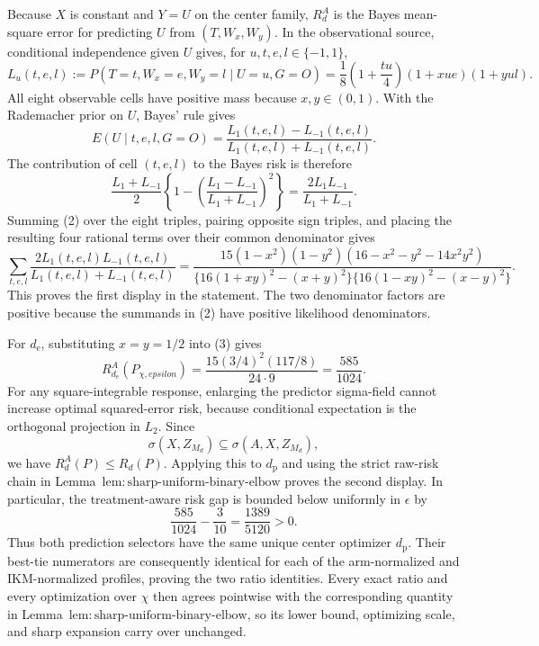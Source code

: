 Because \(X\) is constant and \(Y=U\) on the center family, \(R_d^A\) is the Bayes mean-square error for predicting \(U\) from \((T,W_x,W_y)\). In the observational source, conditional independence given \(U\) gives, for \(u,t,e,l\in\{-1,1\}\),
\[
 L_u(t,e,l):=P(T=t,W_x=e,W_y=l\mid U=u,G=O)
 =\frac18\left(1+\frac{tu}{4}\right)(1+xue)(1+yul). \tag{1}
\]
All eight observable cells have positive mass because \(x,y\in(0,1)\). With the Rademacher prior on \(U\), Bayes' rule gives
\[
 E(U\mid t,e,l,G=O)=\frac{L_1(t,e,l)-L_{-1}(t,e,l)}
 {L_1(t,e,l)+L_{-1}(t,e,l)}.
\]
The contribution of cell \((t,e,l)\) to the Bayes risk is therefore
\[
 \frac{L_1+L_{-1}}2
 \left\{1-\left(\frac{L_1-L_{-1}}{L_1+L_{-1}}\right)^2\right\}
 =\frac{2L_1L_{-1}}{L_1+L_{-1}}. \tag{2}
\]
Summing (2) over the eight triples, pairing opposite sign triples, and placing the resulting four rational terms over their common denominator gives
\[
 \sum_{t,e,l}\frac{2L_1(t,e,l)L_{-1}(t,e,l)}
 {L_1(t,e,l)+L_{-1}(t,e,l)}
 =\frac{15(1-x^2)(1-y^2)(16-x^2-y^2-14x^2y^2)}
 {\{16(1+xy)^2-(x+y)^2\}\{16(1-xy)^2-(x-y)^2\}}. \tag{3}
\]
This proves the first display in the statement. The two denominator factors are positive because the summands in (2) have positive likelihood denominators.

For \(d_{\mathrm e}\), substituting \(x=y=1/2\) into (3) gives
\[
 R_{d_{\mathrm e}}^A(P_{\chi,epsilon})
 =\frac{15(3/4)^2(117/8)}{24\cdot9}
 =\frac{585}{1024}. \tag{4}
\]
For any square-integrable response, enlarging the predictor sigma-field cannot increase optimal squared-error risk, because conditional expectation is the orthogonal projection in \(L_2\). Since
\[
 \sigma(X,Z_{M_d})\subseteq\sigma(A,X,Z_{M_d}),
\]
we have \(R_d^A(P)\le R_d(P)\). Applying this to \(d_{\mathrm p}\) and using the strict raw-risk chain in Lemma~\(\mathrm{lem{:}sharp\text{-}uniform\text{-}binary\text{-}elbow}\) proves the second display. In particular, the treatment-aware risk gap is bounded below uniformly in \(\epsilon\) by
\[
 \frac{585}{1024}-\frac3{10}=\frac{1389}{5120}>0. \tag{5}
\]
Thus both prediction selectors have the same unique center optimizer \(d_{\mathrm p}\). Their best-tie numerators are consequently identical for each of the arm-normalized and IKM-normalized profiles, proving the two ratio identities. Every exact ratio and every optimization over \(\chi\) then agrees pointwise with the corresponding quantity in Lemma~\(\mathrm{lem{:}sharp\text{-}uniform\text{-}binary\text{-}elbow}\), so its lower bound, optimizing scale, and sharp expansion carry over unchanged.